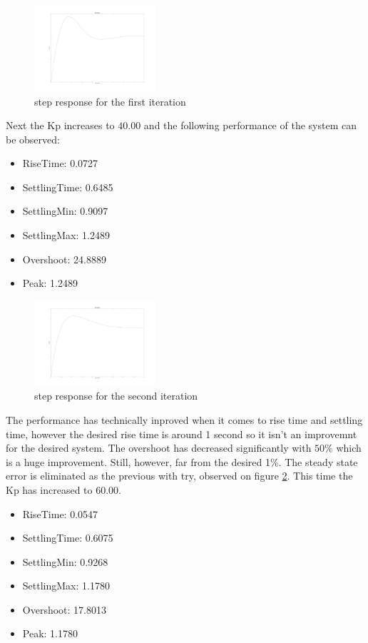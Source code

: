 \documentclass[12pt]{article}
\begin{document}
\begin{figure}[H]
  \centering
  \includegraphics[width=0.4\textwidth]{images/kp_20.jpg}
  \caption{step response for the first iteration} \label{my_first_step}
\end{figure}
Next the Kp increases to $40.00$ and the following performance of the system can be observed:
\begin{itemize}
  \item RiseTime: 0.0727
  \item SettlingTime: 0.6485
  \item SettlingMin: 0.9097
  \item SettlingMax: 1.2489
  \item Overshoot: 24.8889
  \item Peak: 1.2489
\end{itemize}
\begin{figure}[H]
  \centering
  \includegraphics[width=0.4\textwidth]{images/kp_40.jpg}
  \caption{step response for the second iteration} \label{my_second_step}
\end{figure}
The performance has technically inproved when it comes to rise time and settling time, however the desired rise time is around 1 second so it isn't an improvemnt for the desired system. The overshoot has decreased significantly with $50\%$ which is a huge improvement. Still, however, far from the desired 1\%. The steady state error is eliminated as the previous with try, observed on figure \ref{my_second_step}. This time the Kp has increased to $60.00$.
\begin{itemize}
  \item RiseTime: 0.0547
  \item SettlingTime: 0.6075
  \item SettlingMin: 0.9268
  \item SettlingMax:  1.1780
  \item Overshoot: 17.8013
  \item Peak: 1.1780
\end{itemize}
\end{document}
